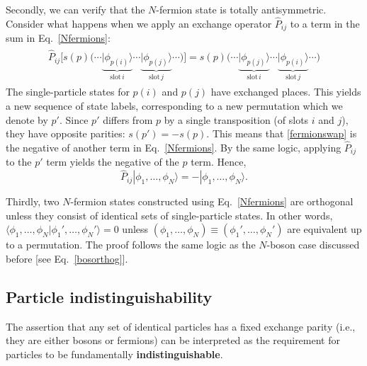 \documentclass[prx,12pt]{revtex4-2}
\begin{document}
Secondly, we can verify that the $N$-fermion state is totally
antisymmetric.  Consider what happens when we apply an exchange
operator $\hat{P}_{ij}$ to a term in the sum in Eq.~\eqref{Nfermions}:
\begin{align}
  \begin{aligned}
    \hat{P}_{ij} \Big[s(p)\big( \cdots
      \underbrace{|\phi_{p(i)}\rangle}_{\textrm{slot}\,i} \cdots
      \underbrace{|\phi_{p(j)}\rangle}_{\textrm{slot}\,j} \cdots \big)\Big]
    = s(p)\big( \cdots
      \underbrace{|\phi_{p(j)}\rangle}_{\textrm{slot}\,i} \cdots
      \underbrace{|\phi_{p(i)}\rangle}_{\textrm{slot}\,j} \cdots \big)
  \end{aligned}
  \label{fermionswap}
\end{align}
The single-particle states for $p(i)$ and $p(j)$ have exchanged
places.  This yields a new sequence of state labels, corresponding to
a new permutation which we denote by $p'$.  Since $p'$ differs from
$p$ by a single transposition (of slots $i$ and $j$), they have
opposite parities: $s(p') = - s(p)$.  This means that
\eqref{fermionswap} is the negative of another term in
Eq.~\eqref{Nfermions}.  By the same logic, applying $\hat{P}_{ij}$ to
the $p'$ term yields the negative of the $p$ term.  Hence,
\begin{equation}
  \hat{P}_{ij} |\phi_1,\dots,\phi_N\rangle = - |\phi_1,\dots,\phi_N\rangle.
\end{equation}

Thirdly, two $N$-fermion states constructed using
Eq.~\eqref{Nfermions} are orthogonal unless they consist of identical
sets of single-particle states.  In other words, $\langle \phi_1,
\dots, \phi_N| \phi_1', \dots, \phi_N'\rangle = 0$ unless $(\phi_1,
\dots, \phi_N) \equiv (\phi_1', \dots, \phi_N')$ are equivalent up to
a permutation.  The proof follows the same logic as the $N$-boson case
discussed before [see Eq.~\eqref{bosorthog}].

\subsection{Particle indistinguishability}
\label{sec:indistinguishability}

The assertion that any set of identical particles has a fixed exchange
parity (i.e., they are either bosons or fermions) can be interpreted
as the requirement for particles to be fundamentally
\textbf{indistinguishable}.
\end{document}

